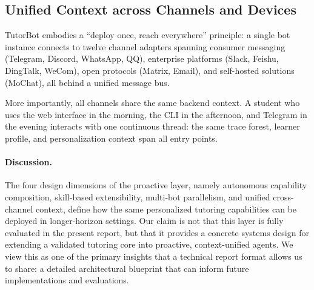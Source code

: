\subsection{Unified Context across Channels and Devices}
\label{sec:channels}

TutorBot embodies a ``deploy once, reach everywhere'' principle: a single bot instance connects to twelve channel adapters spanning consumer messaging (Telegram, Discord, WhatsApp, QQ), enterprise platforms (Slack, Feishu, DingTalk, WeCom), open protocols (Matrix, Email), and self-hosted solutions (MoChat), all behind a unified message bus.

More importantly, all channels share the same backend context.
A student who uses the web interface in the morning, the CLI in the afternoon, and Telegram in the evening interacts with one continuous thread: the same trace forest, learner profile, and personalization context span all entry points.

\paragraph{Discussion.}
The four design dimensions of the proactive layer, namely autonomous capability composition, skill-based extensibility, multi-bot parallelism, and unified cross-channel context, define how the same personalized tutoring capabilities can be deployed in longer-horizon settings.
Our claim is not that this layer is fully evaluated in the present report, but that it provides a concrete systems design for extending a validated tutoring core into proactive, context-unified agents.
We view this as one of the primary insights that a technical report format allows us to share: a detailed architectural blueprint that can inform future implementations and evaluations.
